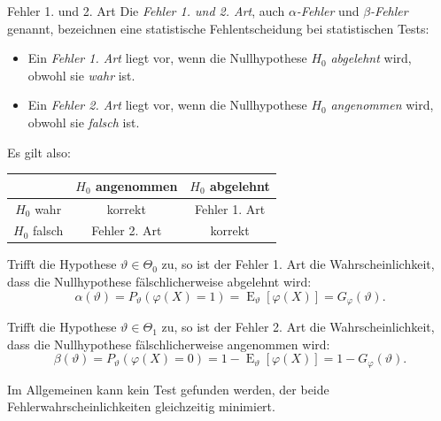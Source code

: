 \begin{defi}{Fehler 1. und 2. Art}
    Die \emph{Fehler 1. und 2. Art}, auch \emph{$\alpha$-Fehler} und \emph{$\beta$-Fehler} genannt, bezeichnen eine statistische Fehlentscheidung bei statistischen Tests:
    \begin{itemize}
        \item Ein \emph{Fehler 1. Art} liegt vor, wenn die Nullhypothese $H_0$ \textit{abgelehnt} wird, obwohl sie \textit{wahr} ist.
        \item Ein \emph{Fehler 2. Art} liegt vor, wenn die Nullhypothese $H_0$ \textit{angenommen} wird, obwohl sie \textit{falsch} ist.
    \end{itemize}

    Es gilt also:
    \begin{center}
        \begin{tabular}{c|cc}
                         & $H_0$ angenommen & $H_0$ abgelehnt \\
            \hline
            $H_0$ wahr   & korrekt          & Fehler 1. Art   \\
            $H_0$ falsch & Fehler 2. Art    & korrekt         \\
        \end{tabular}
    \end{center}

    Trifft die Hypothese $\vartheta \in \Theta_0$ zu, so ist der Fehler 1. Art die Wahrscheinlichkeit, dass die Nullhypothese fälschlicherweise abgelehnt wird:
    \[
        \alpha(\vartheta) = P_{\vartheta}(\varphi(X) = 1) = \operatorname{E}_{\vartheta}[\varphi(X)] = G_{\varphi}(\vartheta).
    \]

    Trifft die Hypothese $\vartheta \in \Theta_1$ zu, so ist der Fehler 2. Art die Wahrscheinlichkeit, dass die Nullhypothese fälschlicherweise angenommen wird:
    \[
        \beta(\vartheta) = P_{\vartheta}(\varphi(X) = 0) = 1 - \operatorname{E}_{\vartheta}[\varphi(X)] = 1 - G_{\varphi}(\vartheta).
    \]

    Im Allgemeinen kann kein Test gefunden werden, der beide Fehlerwahrscheinlichkeiten gleichzeitig minimiert.
\end{defi}

